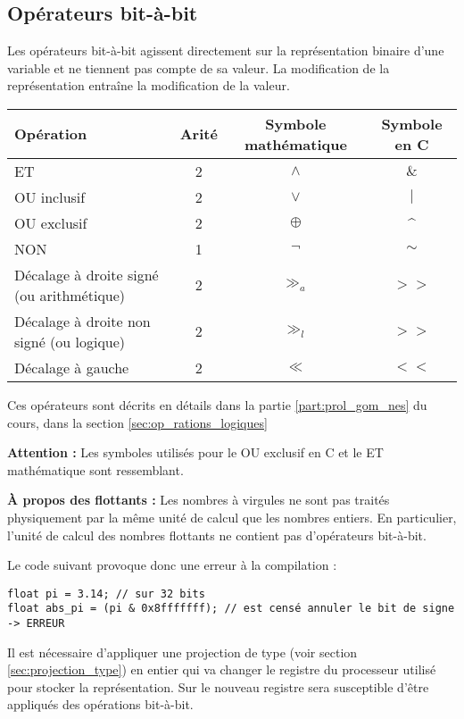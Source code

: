 \documentclass[../../../main.tex]{subfiles}
\begin{document}
\subsection{Opérateurs bit-à-bit}
\label{sub:op_rateurs_bit_bit}
Les opérateurs bit-à-bit agissent directement sur la représentation binaire d'une variable et ne tiennent pas compte de sa valeur. La modification de la représentation entraîne la modification de la valeur.
\begin{center}
\begin{tabular}{l|c|c|c}
Opération & Arité & Symbole mathématique & Symbole en C \\
\hline
ET & 2 & $\wedge$ & $\&$ \\
OU inclusif & 2 & $\vee$ & $|$ \\
OU exclusif & 2 & $\oplus$ & \textasciicircum \\
NON & 1 & $\neg$ & $\sim$ \\
Décalage à droite signé (ou arithmétique) & 2 & $\gg_{a}$ & $>>$ \\
Décalage à droite non signé (ou logique) & 2 & $\gg_{l}$ & $>>$ \\
Décalage à gauche & 2 & $\ll$ & $<<$
\end{tabular}
\end{center}
Ces opérateurs sont décrits en détails dans la partie \ref{part:prol_gom_nes} du cours, dans la section \ref{sec:op_rations_logiques}

\textbf{Attention :} Les symboles utilisés pour le OU exclusif en C et le ET mathématique sont ressemblant.
\begin{minitelbasicbox}{\textbf{À propos des flottants :}}
Les nombres à virgules ne sont pas traités physiquement par la même unité de calcul que les nombres entiers. En particulier, l'unité de calcul des nombres flottants ne contient pas d'opérateurs bit-à-bit.

Le code suivant provoque donc une erreur à la compilation :
\begin{verbatim}
float pi = 3.14; // sur 32 bits
float abs_pi = (pi & 0x8fffffff); // est censé annuler le bit de signe -> ERREUR
\end{verbatim}
Il est nécessaire d'appliquer une projection de type (voir section \ref{sec:projection_type}) en entier qui va changer le registre du processeur utilisé pour stocker la représentation. Sur le nouveau registre sera susceptible d'être appliqués des opérations bit-à-bit.
\end{minitelbasicbox}
\end{document}
